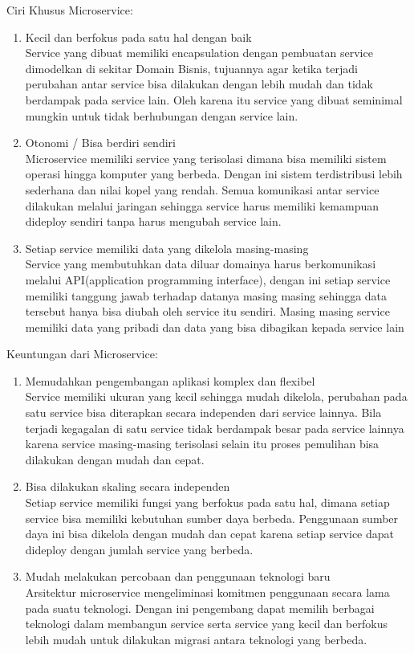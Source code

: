 Ciri Khusus Microservice:	
\begin{enumerate}[leftmargin=1.3cm]
	\item Kecil dan berfokus pada satu hal dengan baik\\
		Service yang dibuat memiliki encapsulation dengan pembuatan service dimodelkan di sekitar Domain Bisnis, tujuannya agar ketika terjadi perubahan antar service bisa dilakukan dengan lebih mudah dan tidak berdampak pada service lain. Oleh karena itu service yang dibuat seminimal mungkin untuk tidak berhubungan dengan service lain. 
	\item Otonomi / Bisa berdiri sendiri\\
		Microservice memiliki service yang terisolasi dimana bisa memiliki sistem operasi hingga komputer yang berbeda. Dengan ini sistem terdistribusi lebih sederhana dan nilai kopel yang rendah. Semua komunikasi antar service dilakukan melalui jaringan sehingga service harus memiliki kemampuan dideploy sendiri tanpa harus mengubah service lain.
	\item Setiap service memiliki data yang dikelola masing-masing\\
		Service yang membutuhkan data diluar domainya harus berkomunikasi melalui API(application programming interface), dengan ini setiap service memiliki tanggung jawab terhadap datanya masing masing sehingga data tersebut hanya bisa diubah oleh service itu sendiri. Masing masing service memiliki data yang pribadi dan data yang bisa dibagikan kepada service lain
\end{enumerate}	

Keuntungan dari Microservice:
\begin{enumerate}[leftmargin=1.3cm]
	\item Memudahkan pengembangan aplikasi komplex dan flexibel\\
	 Service memiliki ukuran yang kecil sehingga mudah dikelola, perubahan pada satu service bisa diterapkan secara independen dari service lainnya. Bila terjadi kegagalan di satu service tidak berdampak besar pada service lainnya karena service masing-masing terisolasi selain itu proses pemulihan bisa dilakukan dengan mudah dan cepat.
	\item Bisa dilakukan skaling secara independen\\ 
	Setiap service memiliki fungsi yang berfokus pada satu hal,  dimana setiap service bisa memiliki kebutuhan sumber daya berbeda. Penggunaan sumber daya ini bisa dikelola dengan mudah dan cepat karena setiap service dapat dideploy dengan jumlah service yang berbeda.
	\item Mudah melakukan percobaan dan penggunaan teknologi baru\\
	Arsitektur microservice mengeliminasi komitmen penggunaan secara lama pada suatu teknologi. Dengan ini pengembang dapat memilih berbagai teknologi dalam membangun service serta service yang kecil dan berfokus lebih mudah untuk dilakukan migrasi antara teknologi yang berbeda. 
\end{enumerate}	

